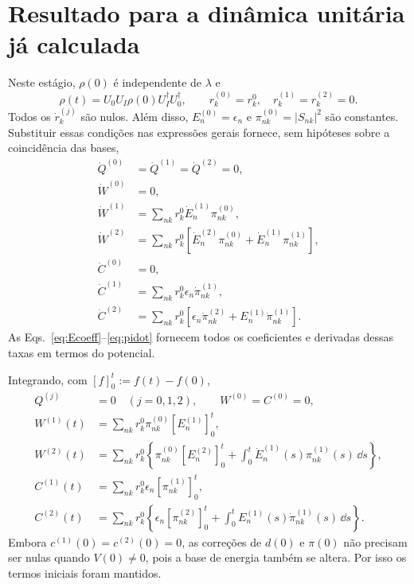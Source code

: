 \section{Resultado para a dinâmica unitária já calculada}
Neste estágio, $\rho(0)$ é independente de $\lambda$ e
\begin{equation}
 \rho(t)=U_0U_I\rho(0)U_I^\dagger U_0^\dagger,\qquad
 r_k^{(0)}=r_k^0,\quad r_k^{(1)}=r_k^{(2)}=0.
 \label{eq:unitaryr}
\end{equation}
Todos os $\dot r_k^{(j)}$ são nulos.
Além disso, $E_n^{(0)}=\epsilon_n$ e
$\pi_{nk}^{(0)}=|S_{nk}|^2$ são constantes.
Substituir essas condições nas expressões gerais fornece,
sem hipóteses sobre a coincidência das bases,
\begin{align}
 \dot Q^{(0)}&=\dot Q^{(1)}=\dot Q^{(2)}=0,\label{eq:unitaryQ}\\
 \dot W^{(0)}&=0,\nonumber\\
 \dot W^{(1)}&=\sum_{nk}r_k^0\dot E_n^{(1)}\pi_{nk}^{(0)},\nonumber\\
 \dot W^{(2)}&=\sum_{nk}r_k^0\left[
     \dot E_n^{(2)}\pi_{nk}^{(0)}
    +\dot E_n^{(1)}\pi_{nk}^{(1)}\right],\label{eq:unitaryW}\\
 \dot C^{(0)}&=0,\nonumber\\
 \dot C^{(1)}&=\sum_{nk}r_k^0\epsilon_n\dot\pi_{nk}^{(1)},\nonumber\\
 \dot C^{(2)}&=\sum_{nk}r_k^0\left[
       \epsilon_n\dot\pi_{nk}^{(2)}
       +E_n^{(1)}\dot\pi_{nk}^{(1)}\right].
 \label{eq:unitaryC}
\end{align}
As Eqs.~\eqref{eq:Ecoeff}--\eqref{eq:pidot} fornecem todos os
coeficientes e derivadas dessas taxas em termos do potencial.

Integrando, com $[f]_0^t:=f(t)-f(0)$,
\begin{align}
 Q^{(j)}&=0\quad(j=0,1,2),\qquad W^{(0)}=C^{(0)}=0,\nonumber\\
 W^{(1)}(t)&=\sum_{nk}r_k^0\pi_{nk}^{(0)}[E_n^{(1)}]_0^t,\nonumber\\
 W^{(2)}(t)&=\sum_{nk}r_k^0\left\{
 \pi_{nk}^{(0)}[E_n^{(2)}]_0^t+
 \int_0^t\dot E_n^{(1)}(s)\pi_{nk}^{(1)}(s)\,\dd s\right\},\nonumber\\
 C^{(1)}(t)&=\sum_{nk}r_k^0\epsilon_n[\pi_{nk}^{(1)}]_0^t,\nonumber\\
 C^{(2)}(t)&=\sum_{nk}r_k^0\left\{
 \epsilon_n[\pi_{nk}^{(2)}]_0^t+
 \int_0^t E_n^{(1)}(s)\dot\pi_{nk}^{(1)}(s)\,\dd s\right\}.
 \label{eq:unitaryintegrals}
\end{align}
Embora $c^{(1)}(0)=c^{(2)}(0)=0$, as correções de $d(0)$ e
$\pi(0)$ não precisam ser nulas quando $V(0)\ne0$, pois a base
de energia também se altera. Por isso os termos iniciais foram mantidos.

